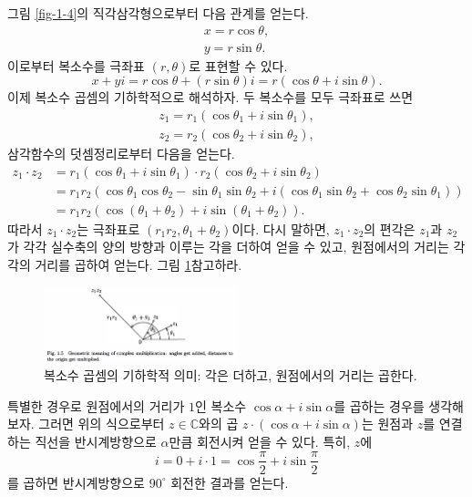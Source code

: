 그림 \ref{fig-1-4}의 직각삼각형으로부터 다음 관계를 얻는다.
\begin{gather*}
x = r \cos\theta, \\
y = r \sin \theta.
\end{gather*}
이로부터 복소수를 극좌표 $(r,\theta)$로 표현할 수 있다.
$$
x + yi = r\cos\theta +(r\sin \theta)i
= r(\cos\theta + i\sin \theta).
$$
이제 복소수 곱셈의 기하학적으로 해석하자.
두 복소수를 모두 극좌표로 쓰면
\begin{gather*}
z_1 = r_1 (\cos\theta_1 + i\sin\theta_1), \\
z_2 = r_2 (\cos\theta_2 + i\sin\theta_2),
\end{gather*}
삼각함수의 덧셈정리로부터 다음을 얻는다.
\begin{align*}
z_1\cdot z_2 &= r_1(\cos\theta_1+i\sin\theta_1) \cdot r_2(\cos\theta_2+i\sin\theta_2) \\
&= r_1r_2 (\cos\theta_1\cos\theta_2 - \sin\theta_1\sin\theta_2 +
i(\cos\theta_1\sin\theta_2 + \cos\theta_2\sin\theta_1)) \\
&= r_1r_2(\cos(\theta_1 +\theta_2) + i \sin(\theta_1 +\theta_2)).
\end{align*}
따라서 $z_1\cdot z_2$는 극좌표로 $(r_1r_2, \theta_1+\theta_2)$이다.
다시 말하면, 
$z_1\cdot z_2$의 편각은
$z_1$과 $z_2$가 각각 실수축의 양의 방향과 이루는 각을 더하여 얻을 수 있고,
원점에서의 거리는 각각의 거리를 곱하여 얻는다.
그림 \ref{fig-1-5}\를 참고하라.

\begin{figure}[!h]
\begin{center}
\includegraphics[width=0.5\textwidth]{./SaltChapter/fig-1-5}
\end{center}
\caption{복소수 곱셈의 기하학적 의미: 각은 더하고, 원점에서의 거리는 곱한다.}
\label{fig-1-5}
\end{figure}

특별한 경우로 원점에서의 거리가 $1$인 복소수
$\cos\alpha + i \sin\alpha$를 곱하는 경우를 생각해보자.
그러면 위의 식으로부터 $z\in\mathbb C$와의 곱
$z\cdot(\cos\alpha + i\sin\alpha)$는 
원점과 $z$를 연결하는 직선을 반시계방향으로 $\alpha$만큼 회전시켜 얻을 수 있다.
특히, $z$에 
$$
i = 0 + i\cdot 1 = \cos\frac\pi2 + i \sin\frac\pi2
$$
를 곱하면 반시계방향으로 $90^{\circ}$ 회전한 결과를 얻는다.

